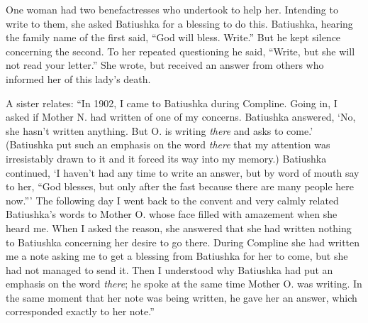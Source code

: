 One woman had two benefactresses who undertook to help her. Intending to write to them, she asked Batiushka for a blessing to do this. Batiushka, hearing the family name of the first said, ``God will bless. Write.'' But he kept silence concerning the second. To her repeated questioning he said, ``Write, but she will not read your letter.'' She wrote, but received an answer from others who informed her of this lady's death.

A sister relates: ``In 1902, I came to Batiushka during Compline. Going in, I asked if Mother N. had written of one of my concerns. Batiushka answered, `No, she hasn't written anything. But O. is writing \textit{there} and asks to come.' (Batiushka put such an emphasis on the word \textit{there} that my attention was irresistably drawn to it and it forced its way into my memory.) Batiushka continued, `I haven't had any time to write an answer, but by word of mouth say to her, ``God blesses, but only after the fast because there are many people here now.''' The following day I went back to the convent and very calmly related Batiushka's words to Mother O. whose face filled with amazement when she heard me. When I asked the reason, she answered that she had written nothing to Batiushka concerning her desire to go there. During Compline she had written me a note asking me to get a blessing from Batiushka for her to come, but she had not managed to send it. Then I understood why Batiushka had put an emphasis on the word \textit{there}; he spoke at the same time Mother O. was writing. In the same moment that her note was being written, he gave her an answer, which corresponded exactly to her note.''



